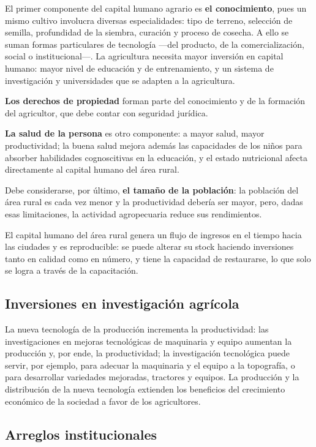 \documentclass[
  man,
  floatsintext,
  longtable,
  a4paper,
  nolmodern,
  notxfonts,
  notimes,
  12pt,
  colorlinks=true,linkcolor=blue,citecolor=blue,urlcolor=blue]{apa7}
\begin{document}
El primer componente del capital humano agrario es \textbf{el
conocimiento}, pues un mismo cultivo involucra diversas especialidades:
tipo de terreno, selección de semilla, profundidad de la siembra,
curación y proceso de cosecha. A ello se suman formas particulares de
tecnología ---del producto, de la comercialización, social o
institucional---. La agricultura necesita mayor inversión en capital
humano: mayor nivel de educación y de entrenamiento, y un sistema de
investigación y universidades que se adapten a la agricultura.

\textbf{Los derechos de propiedad} forman parte del conocimiento y de la
formación del agricultor, que debe contar con seguridad jurídica.

\textbf{La salud de la persona} es otro componente: a mayor salud, mayor
productividad; la buena salud mejora además las capacidades de los niños
para absorber habilidades cognoscitivas en la educación, y el estado
nutricional afecta directamente al capital humano del área rural.

Debe considerarse, por último, \textbf{el tamaño de la población}: la
población del área rural es cada vez menor y la productividad debería
ser mayor, pero, dadas esas limitaciones, la actividad agropecuaria
reduce sus rendimientos.

El capital humano del área rural genera un flujo de ingresos en el
tiempo hacia las ciudades y es reproducible: se puede alterar su stock
haciendo inversiones tanto en calidad como en número, y tiene la
capacidad de restaurarse, lo que solo se logra a través de la
capacitación.

\subsection{Inversiones en investigación
agrícola}\label{inversiones-en-investigaciuxf3n-agruxedcola}

La nueva tecnología de la producción incrementa la productividad: las
investigaciones en mejoras tecnológicas de maquinaria y equipo aumentan
la producción y, por ende, la productividad; la investigación
tecnológica puede servir, por ejemplo, para adecuar la maquinaria y el
equipo a la topografía, o para desarrollar variedades mejoradas,
tractores y equipos. La producción y la distribución de la nueva
tecnología extienden los beneficios del crecimiento económico de la
sociedad a favor de los agricultores.

\subsection{Arreglos institucionales}\label{arreglos-institucionales}
\end{document}

